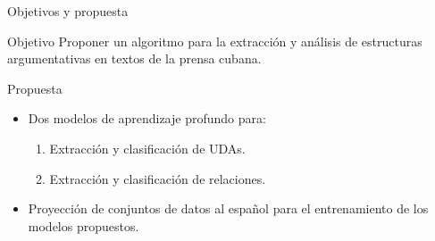 \documentclass{beamer}
\begin{document}
\begin{frame}{Objetivos y propuesta}

    \begin{block}{Objetivo}
        \pause
        Proponer un algoritmo para la extracción y
        análisis de estructuras argumentativas en textos de la prensa cubana.
    \end{block}
    \pause
    \begin{block}{Propuesta}
        \pause
        \begin{itemize}
            \item Dos modelos de aprendizaje profundo para:
            \begin{enumerate}
                \pause
                \item Extracción y clasificación de UDAs.
                \pause
                \item Extracción y clasificación de relaciones.
            \end{enumerate}
            \pause
            \item Proyección de conjuntos de datos al español para el entrenamiento de los modelos
            propuestos. 
        \end{itemize}
    \end{block}
\end{frame}
\end{document}
